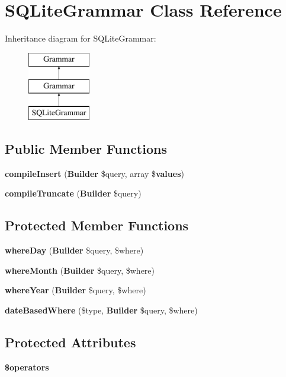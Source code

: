 \section{S\+Q\+Lite\+Grammar Class Reference}
\label{class_illuminate_1_1_database_1_1_query_1_1_grammars_1_1_s_q_lite_grammar}
Inheritance diagram for S\+Q\+Lite\+Grammar\+:\begin{figure}[H]
\begin{center}
\leavevmode
\includegraphics[height=3.000000cm]{class_illuminate_1_1_database_1_1_query_1_1_grammars_1_1_s_q_lite_grammar}
\end{center}
\end{figure}
\subsection*{Public Member Functions}
\begin{DoxyCompactItemize}
\item 
{\bf compile\+Insert} ({\bf Builder} \$query, array \${\bf values})
\item 
{\bf compile\+Truncate} ({\bf Builder} \$query)
\end{DoxyCompactItemize}
\subsection*{Protected Member Functions}
\begin{DoxyCompactItemize}
\item 
{\bf where\+Day} ({\bf Builder} \$query, \$where)
\item 
{\bf where\+Month} ({\bf Builder} \$query, \$where)
\item 
{\bf where\+Year} ({\bf Builder} \$query, \$where)
\item 
{\bf date\+Based\+Where} (\$type, {\bf Builder} \$query, \$where)
\end{DoxyCompactItemize}
\subsection*{Protected Attributes}
\begin{DoxyCompactItemize}
\item 
{\bf \$operators}
\end{DoxyCompactItemize}


